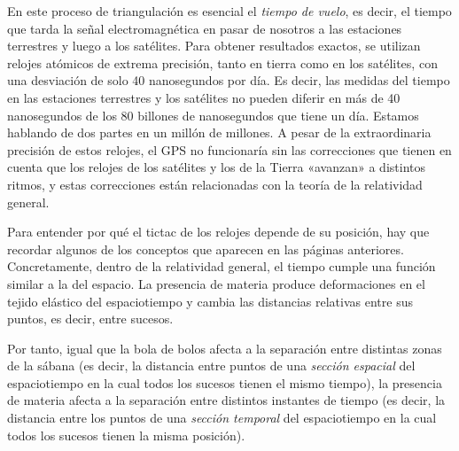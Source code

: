 En este proceso de triangulación es esencial el \emph{tiempo de vuelo}, es decir,
el tiempo que tarda la señal electromagnética en pasar de nosotros a las estaciones
terrestres y luego a los satélites. Para obtener resultados exactos, se utilizan
relojes atómicos de extrema precisión, tanto en tierra como en
los satélites, con una desviación de solo 40 nanosegundos por día. Es decir, las
medidas del tiempo en las estaciones terrestres y los satélites no pueden diferir
en más de 40 nanosegundos de los 80 billones de nanosegundos que tiene un día.
Estamos hablando de dos partes en un millón de millones. A pesar de la
extraordinaria precisión de estos relojes, el GPS no funcionaría sin las
correcciones que tienen en cuenta que los relojes de los satélites y los de la
Tierra «avanzan» a distintos ritmos, y estas correcciones están relacionadas con la
teoría de la relatividad general.

Para entender por qué el tictac de los relojes depende de su posición, hay que
recordar algunos de los conceptos que aparecen en las páginas anteriores.
Concretamente, dentro de la relatividad general, el tiempo cumple una función
similar a la del espacio. La presencia de materia produce deformaciones en el
tejido elástico del espaciotiempo y cambia las distancias relativas entre sus
puntos, es decir, entre sucesos.

Por tanto, igual que la bola de bolos afecta a la separación entre distintas zonas
de la sábana (es decir, la distancia entre puntos de una \emph{sección
espacial} del espaciotiempo en la cual todos los sucesos
tienen el mismo tiempo), la presencia de materia afecta a la separación entre
distintos instantes de tiempo (es decir, la distancia entre los puntos de una
\emph{sección temporal} del espaciotiempo en la cual todos los
sucesos tienen la misma posición).

